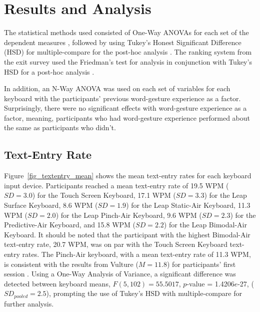 \chapter{Results and Analysis} \label{5_results}
The statistical methods used consisted of One-Way ANOVAs for each set of the dependent measures \cite{ref_anova_1,ref_anova_2}, followed by using Tukey's Honest Significant Difference (HSD) for multiple-compare for the post-hoc analysis \cite{ref_mult_compare}. The ranking system from the exit survey used the Friedman's test for analysis in conjunction with Tukey's HSD for a post-hoc analysis \cite{ref_friedmans}.

In addition, an N-Way ANOVA was used on each set of variables for each keyboard with the participants' previous word-gesture experience as a factor. Surprisingly, there were no significant effects with word-gesture experience as a factor, meaning, participants who had word-gesture experience performed about the same as participants who didn't.

\section{Text-Entry Rate}
Figure~\ref{fig_textentry_mean} shows the mean text-entry rates for each keyboard input device. Participants reached a mean text-entry rate of 19.5 WPM ($SD = 3.0$) for the Touch Screen Keyboard, 17.1 WPM ($SD = 3.3$) for the Leap Surface Keyboard, 8.6 WPM ($SD = 1.9$) for the Leap Static-Air Keyboard, 11.3 WPM ($SD = 2.0$) for the Leap Pinch-Air Keyboard, 9.6 WPM ($SD = 2.3$) for the Predictive-Air Keyboard, and 15.8 WPM ($SD = 2.2$) for the Leap Bimodal-Air Keyboard. It should be noted that the participant with the highest Bimodal-Air text-entry rate, 20.7 WPM, was on par with the Touch Screen Keyboard text-entry rates. The Pinch-Air keyboard, with a mean text-entry rate of 11.3 WPM, is consistent with the results from Vulture ($M = 11.8$) for participants' first session \cite{ref_vulture}. Using a One-Way Analysis of Variance, a significant difference was detected between keyboard means, $F(5, 102) = 55.5017$, $p$-value = 1.4206$e$-27, ($SD_{pooled} = 2.5$), prompting the use of Tukey's HSD with multiple-compare for further analysis.

